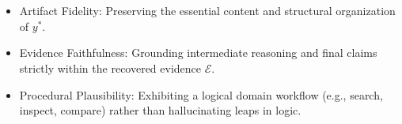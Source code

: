 \begin{itemize}[leftmargin=*, topsep=3pt, partopsep=0pt, itemsep=0pt, parsep=3pt] 
    \item Artifact Fidelity: Preserving the essential content and structural organization of $y^{*}$.
    \item Evidence Faithfulness: Grounding intermediate reasoning and final claims strictly within the recovered evidence $\hat{\mathcal{E}}$.
    \item Procedural Plausibility: Exhibiting a logical domain workflow (e.g., search, inspect, compare) rather than hallucinating leaps in logic.
\end{itemize}


